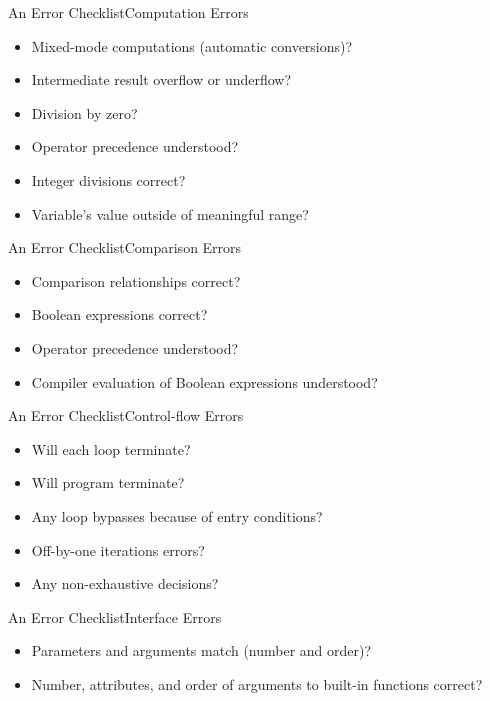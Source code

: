 \begin{Frame}{An Error Checklist}{Computation Errors}
  \begin{itemize}
    \item Mixed-mode computations (automatic conversions)?
    \item Intermediate result overflow or underflow?
    \item Division by zero?
    \item Operator precedence understood?
    \item Integer divisions correct?
    \item Variable's value outside of meaningful range?
  \end{itemize}
\end{Frame}

\begin{Frame}{An Error Checklist}{Comparison Errors}
  \begin{itemize}
    \item Comparison relationships correct?
    \item Boolean expressions correct?
    \item Operator precedence understood?
    \item Compiler evaluation of Boolean expressions understood?
  \end{itemize}
\end{Frame}

\begin{Frame}{An Error Checklist}{Control-flow Errors}
  \begin{itemize}
    \item Will each loop terminate?
    \item Will program terminate?
    \item Any loop bypasses because of entry conditions?
    \item Off-by-one iterations errors?
    \item Any non-exhaustive decisions?
  \end{itemize}
\end{Frame}

\begin{Frame}{An Error Checklist}{Interface Errors}
  \begin{itemize}
    \item Parameters and arguments match (number and order)?
    \item Number, attributes, and order of arguments to built-in functions correct?
  \end{itemize}
\end{Frame}

